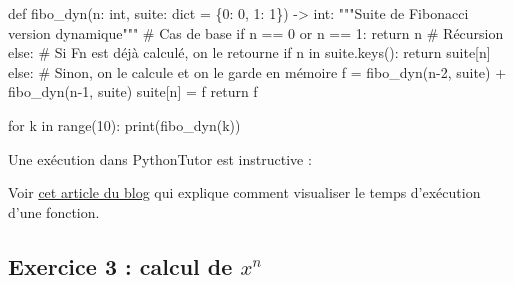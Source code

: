 \documentclass[
  a4paper,
  DIV=11,
  numbers=noendperiod]{scrartcl}
\newenvironment{Shaded}{\begin{snugshade}}{\end{snugshade}}
\newcommand{\BuiltInTok}[1]{\textcolor[rgb]{0.00,0.23,0.31}{#1}}
\newcommand{\CommentTok}[1]{\textcolor[rgb]{0.37,0.37,0.37}{#1}}
\newcommand{\ControlFlowTok}[1]{\textcolor[rgb]{0.00,0.23,0.31}{#1}}
\newcommand{\DecValTok}[1]{\textcolor[rgb]{0.68,0.00,0.00}{#1}}
\newcommand{\KeywordTok}[1]{\textcolor[rgb]{0.00,0.23,0.31}{#1}}
\newcommand{\NormalTok}[1]{\textcolor[rgb]{0.00,0.23,0.31}{#1}}
\newcommand{\OperatorTok}[1]{\textcolor[rgb]{0.37,0.37,0.37}{#1}}
\begin{document}
\begin{tcolorbox}
\begin{Shaded}
\begin{Highlighting}[]
\KeywordTok{def}\NormalTok{ fibo\_dyn(n: }\BuiltInTok{int}\NormalTok{, suite: }\BuiltInTok{dict} \OperatorTok{=}\NormalTok{ \{}\DecValTok{0}\NormalTok{: }\DecValTok{0}\NormalTok{, }\DecValTok{1}\NormalTok{: }\DecValTok{1}\NormalTok{\}) }\OperatorTok{{-}\textgreater{}} \BuiltInTok{int}\NormalTok{:}
    \CommentTok{"""Suite de Fibonacci version dynamique"""}
    \CommentTok{\# Cas de base}
    \ControlFlowTok{if}\NormalTok{ n }\OperatorTok{==} \DecValTok{0} \KeywordTok{or}\NormalTok{ n }\OperatorTok{==} \DecValTok{1}\NormalTok{:}
        \ControlFlowTok{return}\NormalTok{ n}
    \CommentTok{\# Récursion}
    \ControlFlowTok{else}\NormalTok{:}
        \CommentTok{\# Si Fn est déjà calculé, on le retourne}
        \ControlFlowTok{if}\NormalTok{ n }\KeywordTok{in}\NormalTok{ suite.keys():}
            \ControlFlowTok{return}\NormalTok{ suite[n]}
        \ControlFlowTok{else}\NormalTok{:}
            \CommentTok{\# Sinon, on le calcule et on le garde en mémoire}
\NormalTok{            f }\OperatorTok{=}\NormalTok{ fibo\_dyn(n}\OperatorTok{{-}}\DecValTok{2}\NormalTok{, suite) }\OperatorTok{+}\NormalTok{ fibo\_dyn(n}\OperatorTok{{-}}\DecValTok{1}\NormalTok{, suite)}
\NormalTok{            suite[n] }\OperatorTok{=}\NormalTok{ f}
            \ControlFlowTok{return}\NormalTok{ f}


\ControlFlowTok{for}\NormalTok{ k }\KeywordTok{in} \BuiltInTok{range}\NormalTok{(}\DecValTok{10}\NormalTok{):}
    \BuiltInTok{print}\NormalTok{(fibo\_dyn(k))}
\end{Highlighting}
\end{Shaded}

Une exécution dans PythonTutor est instructive :

Voir
\href{https://www.flallemand.fr/wp/2022/06/05/mesurer-le-temps-dexecution-dun-fragment-de-code/}{cet
article du blog} qui explique comment visualiser le temps d'exécution
d'une fonction.

\end{tcolorbox}

\hypertarget{fa-solid-pencil-alt-fa-desktop-exercice-3-calcul-de-xn}{%
\subsection{\texorpdfstring{ 
Exercice 3 : calcul de
\(x^n\)}{  Exercice 3 : calcul de x\^{}n}}\label{fa-solid-pencil-alt-fa-desktop-exercice-3-calcul-de-xn}}
\end{document}
